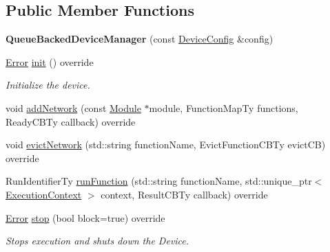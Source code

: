 \subsection*{Public Member Functions}
\begin{DoxyCompactItemize}
\item 
\mbox{\label{classglow_1_1runtime_1_1_queue_backed_device_manager_a31ddd34608498b2e2366bc36c684fa23}} 
{\bfseries Queue\+Backed\+Device\+Manager} (const \hyperlink{structglow_1_1runtime_1_1_device_config}{Device\+Config} \&config)
\item 
\mbox{\label{classglow_1_1runtime_1_1_queue_backed_device_manager_a25d93d146f471024d9a8c9d0da193838}} 
\hyperlink{namespaceglow_afdb176c3a672ef66db0ecfc19a8d39bf}{Error} \hyperlink{classglow_1_1runtime_1_1_queue_backed_device_manager_a25d93d146f471024d9a8c9d0da193838}{init} () override
\begin{DoxyCompactList}\small\item\em Initialize the device. \end{DoxyCompactList}\item 
void \hyperlink{classglow_1_1runtime_1_1_queue_backed_device_manager_a70b2d1886841e1c223e6813e218545f5}{add\+Network} (const \hyperlink{classglow_1_1_module}{Module} $\ast$module, Function\+Map\+Ty functions, Ready\+C\+B\+Ty callback) override
\item 
void \hyperlink{classglow_1_1runtime_1_1_queue_backed_device_manager_abbccad8e2a9b082eb6c5865352c67ef8}{evict\+Network} (std\+::string function\+Name, Evict\+Function\+C\+B\+Ty evict\+CB) override
\item 
Run\+Identifier\+Ty \hyperlink{classglow_1_1runtime_1_1_queue_backed_device_manager_a46bdff62e862da50435f4744a3587f1a}{run\+Function} (std\+::string function\+Name, std\+::unique\+\_\+ptr$<$ \hyperlink{classglow_1_1_execution_context}{Execution\+Context} $>$ context, Result\+C\+B\+Ty callback) override
\item 
\mbox{\label{classglow_1_1runtime_1_1_queue_backed_device_manager_a5be3e94c59e1a4a65d7d09db114d125f}} 
\hyperlink{namespaceglow_afdb176c3a672ef66db0ecfc19a8d39bf}{Error} \hyperlink{classglow_1_1runtime_1_1_queue_backed_device_manager_a5be3e94c59e1a4a65d7d09db114d125f}{stop} (bool block=true) override
\begin{DoxyCompactList}\small\item\em Stops execution and shuts down the Device. \end{DoxyCompactList}\end{DoxyCompactItemize}
